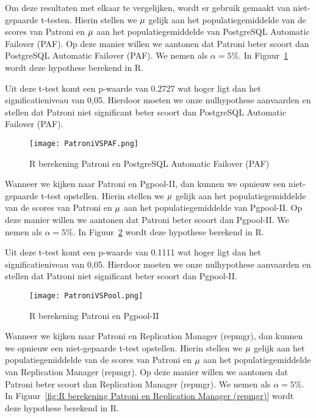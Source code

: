 Om deze resultaten met elkaar te vergelijken, wordt er gebruik gemaakt van niet-gepaarde t-testen. Hierin stellen we $\mu\index{1}$ gelijk aan het populatiegemiddelde van de scores van Patroni en $\mu\index{2}$ aan het populatiegemiddelde van PostgreSQL Automatic Failover (PAF). Op deze manier willen we aantonen dat Patroni beter scoort dan PostgreSQL Automatic Failover (PAF). We nemen als $\alpha = 5\%$. In Figuur~\ref{fig:R berekening Patroni en PostgreSQL Automatic Failover (PAF)} wordt deze hypothese berekend in R.

Uit deze t-test komt een p-waarde van 0.2727 wat hoger ligt dan het significatieniveau van 0,05. Hierdoor moeten we onze nulhypothese aanvaarden en stellen dat Patroni niet significant beter scoort dan PostgreSQL Automatic Failover (PAF). 

\begin{figure}[!h]
    \centering
    \texttt{[image: PatroniVSPAF.png]}
    \caption{R berekening Patroni en PostgreSQL Automatic Failover (PAF)}
    \label{fig:R berekening Patroni en PostgreSQL Automatic Failover (PAF)}
\end{figure}

Wanneer we kijken naar Patroni en Pgpool-II, dan kunnen we opnieuw een niet-gepaarde t-test opstellen. Hierin stellen we $\mu\index{1}$ gelijk aan het populatiegemiddelde van de scores van Patroni en $\mu\index{2}$ aan het populatiegemiddelde van Pgpool-II. Op deze manier willen we aantonen dat Patroni beter scoort dan Pgpool-II. We nemen als $\alpha = 5\%$. In Figuur~\ref{fig:R berekening Patroni en Pgpool-II} wordt deze hypothese berekend in R.

Uit deze t-test komt een p-waarde van 0.1111 wat hoger ligt dan het significatieniveau van 0,05. Hierdoor moeten we onze nulhypothese aanvaarden en stellen dat Patroni niet significant beter scoort dan Pgpool-II.

\begin{figure}[!h]
    \centering
    \texttt{[image: PatroniVSPool.png]}
    \caption{R berekening Patroni en Pgpool-II}
    \label{fig:R berekening Patroni en Pgpool-II}
\end{figure}

Wanneer we kijken naar Patroni en Replication Manager (repmgr), dan kunnen we opnieuw een niet-gepaarde t-test opstellen. Hierin stellen we $\mu\index{1}$ gelijk aan het populatiegemiddelde van de scores van Patroni en $\mu\index{2}$ aan het populatiegemiddelde van Replication Manager (repmgr). Op deze manier willen we aantonen dat Patroni beter scoort dan Replication Manager (repmgr). We nemen als $\alpha = 5\%$. In Figuur~\ref{fig:R berekening Patroni en Replication Manager (repmgr)} wordt deze hypothese berekend in R.

